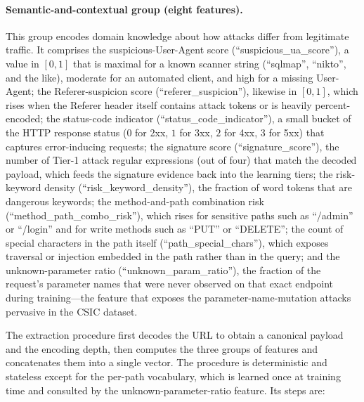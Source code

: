 \documentclass[12pt,a4paper]{report}
\begin{document}
\paragraph{Semantic-and-contextual group (eight features).} This group
encodes domain knowledge about how attacks differ from legitimate traffic. It
comprises the suspicious-User-Agent score (``suspicious\_ua\_score''), a
value in $[0,1]$ that is maximal for a known scanner string (``sqlmap'',
``nikto'', and the like), moderate for an automated client, and high for
a missing User-Agent; the Referer-suspicion score
(``referer\_suspicion''), likewise in $[0,1]$, which rises when the
Referer header itself contains attack tokens or is heavily percent-encoded;
the status-code indicator (``status\_code\_indicator''), a small bucket
of the HTTP response status ($0$ for 2xx, $1$ for 3xx, $2$ for 4xx, $3$ for
5xx) that captures error-inducing requests; the signature score
(``signature\_score''), the number of Tier-1 attack regular expressions
(out of four) that match the decoded payload, which feeds the signature
evidence back into the learning tiers; the risk-keyword density
(``risk\_keyword\_density''), the fraction of word tokens that are
dangerous keywords; the method-and-path combination risk
(``method\_path\_combo\_risk''), which rises for sensitive paths such as
``/admin'' or ``/login'' and for write methods such as ``PUT''
or ``DELETE''; the count of special characters in the path itself
(``path\_special\_chars''), which exposes traversal or injection embedded
in the path rather than in the query; and the unknown-parameter ratio
(``unknown\_param\_ratio''), the fraction of the request's parameter
names that were never observed on that exact endpoint during training---the
feature that exposes the parameter-name-mutation attacks pervasive in the
CSIC dataset.

The extraction procedure first decodes the URL to obtain a canonical payload
and the encoding depth, then computes the three groups of features and
concatenates them into a single vector. The procedure is deterministic and
stateless except for the per-path vocabulary, which is learned once at
training time and consulted by the unknown-parameter-ratio feature. Its
steps are:
\end{document}
